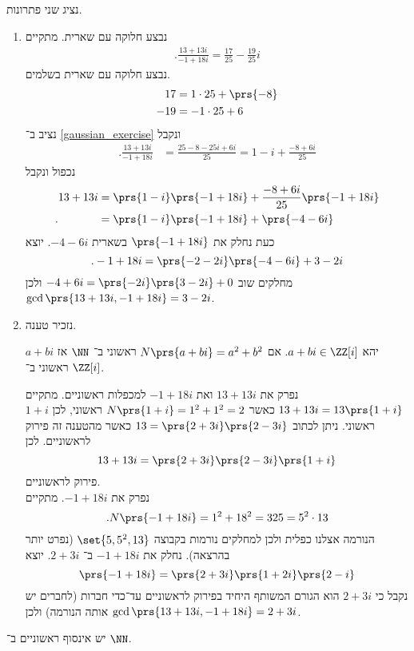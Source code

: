 \documentclass[a4paper,10pt,twoside,openany]{book}
\begin{document}
\begin{solution}
נציג שני פתרונות.
\begin{enumerate}
\item נבצע חלוקה עם שארית.
מתקיים
\begin{align} \label{gaussian_exercise}
\text{.}\frac{13 + 13i}{-1+18i} = \frac{17}{25}-\frac{19}{25}i
\end{align}
נבצע חלוקה עם שארית בשלמים.
\begin{align*}
17 &= 1\cdot 25 + \prs{-8} \\
-19 &= -1\cdot 25 + 6
\end{align*}
נציב ב־%
\ref{gaussian_exercise}
ונקבל
\begin{align*}
\text{.} \frac{13 + 13i}{-1+18i} &= \frac{25 - 8 - 25i + 6i}{25} = 1-i + \frac{-8 + 6i}{25}
\end{align*}
נכפול ונקבל
\begin{align*}
13+13i &= \prs{1-i}\prs{-1+18i} + \frac{-8 + 6i}{25}\prs{-1+18i} \\
\text{.} \phantom{13+13i} &= \prs{1-i}\prs{-1+18i} + \prs{-4 -6i}
\end{align*}
כעת נחלק את
$\prs{-1 + 18i}$
בשארית
$-4-6i$.
יוצא
\[\text{.} -1 + 18i = \prs{-2-2i}\prs{-4-6i} + 3 - 2i\]
מחלקים שוב
$-4+6i = \prs{-2i}\prs{3-2i} + 0$
ולכן
$\gcd\prs{13+13i, -1+18i} = 3-2i$.
\item
נזכיר טענה.
\begin{proposition}
יהא
$a+bi \in \ZZ[i]$.
אם
$N\prs{a+bi} = a^2 + b^2$
ראשוני ב־%
$\NN$
אז
$a+bi$
ראשוני ב־%
$\ZZ[i]$.
\end{proposition}
נפרק את
$13 + 13i$
ואת
$-1+18i$
למכפלות ראשוניים.
מתקיים
$13 + 13i = 13\prs{1+i}$
כאשר
$N\prs{1+i} = 1^2 + 1^2 = 2$
ראשוני, לכן
$1+i$
ראשוני.
ניתן לכתוב
$13 = \prs{2+3i}\prs{2-3i}$
כאשר מהטענה זה פירוק לראשוניים.
לכן
\[13+13i = \prs{2+3i}\prs{2-3i}\prs{1+i}\]
פירוק לראשוניים.
\\
נפרק את
$-1 + 18i$.
מתקיים
\[\text{.} N\prs{-1+18i} = 1^2 + 18^2 = 325 = 5^2 \cdot 13\]
הנורמה אצלנו כפלית ולכן למחלקים נורמות בקבוצה
$\set{5, 5^2, 13}$
(נפרט יותר בהרצאה).
נחלק את
$-1 + 18i$
ב־%
$2+3i$.
יוצא
\[\prs{-1+18i} = \prs{2+3i}\prs{1+2i}\prs{2-i}\]
נקבל כי $2+3i$
הוא הגורם המשותף היחיד בפירוק לראשוניים עד־כדי חברות (לחברים יש אותה הנורמה) ולכן
$\gcd\prs{13+13i, -1+18i} = 2+3i$.
\end{enumerate}
\end{solution}
\begin{theorem}[אוקלידס]
יש אינסוף ראשוניים ב־%
$\NN$.
\end{theorem}
\end{document}
